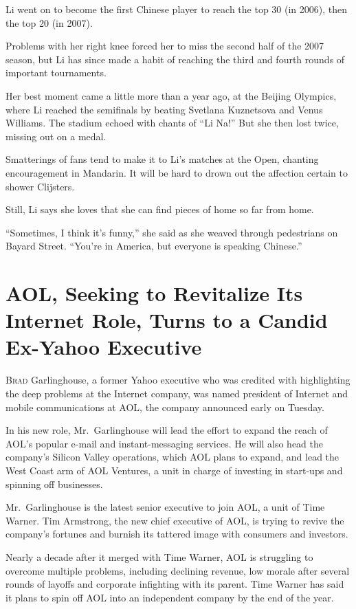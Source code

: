 ﻿\documentclass[12pt]{article}
\begin{document}
Li went on to become the first Chinese player to reach the top 30 (in 2006), then the top 20 (in
2007).

Problems with her right knee forced her to miss the second half of the 2007 season, but Li has since
made a habit of reaching the third and fourth rounds of important tournaments.

Her best moment came a little more than a year ago, at the Beijing Olympics, where Li reached the
semifinals by beating Svetlana Kuznetsova and Venus Williams. The stadium echoed with chants of ``Li
Na!'' But she then lost twice, missing out on a medal.

Smatterings of fans tend to make it to Li's matches at the Open, chanting encouragement in Mandarin.
It will be hard to drown out the affection certain to shower Clijsters.

Still, Li says she loves that she can find pieces of home so far from home.

``Sometimes, I think it's funny,'' she said as she weaved through pedestrians on Bayard Street.
``You're in America, but everyone is speaking Chinese.''

\section{AOL, Seeking to Revitalize Its Internet Role, Turns to a Candid Ex-Yahoo Executive }

\lettrine{B}{rad} Garlinghouse, a former Yahoo executive who was credited with highlighting the deep
problems at the Internet company, was named president of Internet and mobile communications at AOL,
the company announced early on Tuesday.

In his new role, Mr.~Garlinghouse will lead the effort to expand the reach of AOL's popular e-mail
and instant-messaging services. He will also head the company's Silicon Valley operations, which AOL
plans to expand, and lead the West Coast arm of AOL Ventures, a unit in charge of investing in
start-ups and spinning off businesses.

Mr.~Garlinghouse is the latest senior executive to join AOL, a unit of Time Warner. Tim Armstrong,
the new chief executive of AOL, is trying to revive the company's fortunes and burnish its tattered
image with consumers and investors.

Nearly a decade after it merged with Time Warner, AOL is struggling to overcome multiple problems,
including declining revenue, low morale after several rounds of layoffs and corporate infighting
with its parent. Time Warner has said it plans to spin off AOL into an independent company by the
end of the year.
\end{document}
